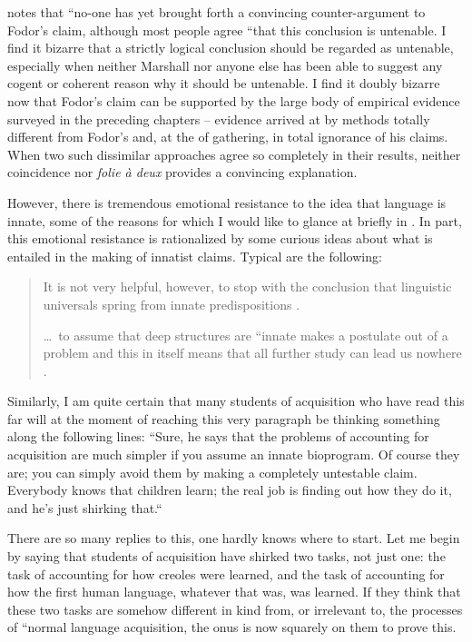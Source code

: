 \citet{Marshall1979} notes that ``no-one has yet brought forth a convincing counter-argument to Fodor's claim, although most people agree ``that this conclusion is untenable. I find it bizarre that a strictly logical conclusion should be regarded as untenable, especially when neither Marshall nor anyone else has been able to suggest any cogent or coherent reason why it should be untenable. I find it doubly bizarre now that Fodor's claim can be supported by the large body of empirical evidence surveyed in the preceding chapters -- evidence arrived at by methods totally different from Fodor's and, at the  of gathering, in total ignorance of his claims. When two such dissimilar approaches agree so completely in their results, neither coincidence nor \textit{folie \`a deux} provides a convincing explanation.

However, there is tremendous emotional resistance to the idea that language is innate, some of the reasons for which I would like to glance at briefly in . In part, this emotional resistance is rationalized by some curious ideas about what is entailed in the making of innatist claims. Typical are the following:

\begin{quotation}
It is not very helpful, however, to stop with the conclusion that linguistic universals spring from innate predispositions \citep[517]{ClarkEtAl1977}.

\ldots~to assume that deep structures are ``innate makes a postulate out of a problem and this in itself means that all further study can lead us nowhere \citep[383]{Luria1975}.

\end{quotation}

Similarly, I am quite certain that many students of acquisition who have read this far will at the moment of reaching this very paragraph be thinking something along the following lines: ``Sure, he says that the problems of accounting for acquisition are much simpler if you assume an innate bioprogram. Of course they are; you can simply avoid them by making a completely untestable claim. Everybody knows that children learn; the real job is finding out how they do it, and he's just shirking that.``


There are so many replies to this, one hardly knows where to start. Let me begin by saying that students of acquisition have shirked two tasks, not just one: the task of accounting for how creoles were learned, and the task of accounting for how the first human language, whatever that was, was learned. If they think that these two tasks are somehow different in kind from, or irrelevant to, the processes of ``normal language acquisition, the onus is now squarely on them to prove this.


